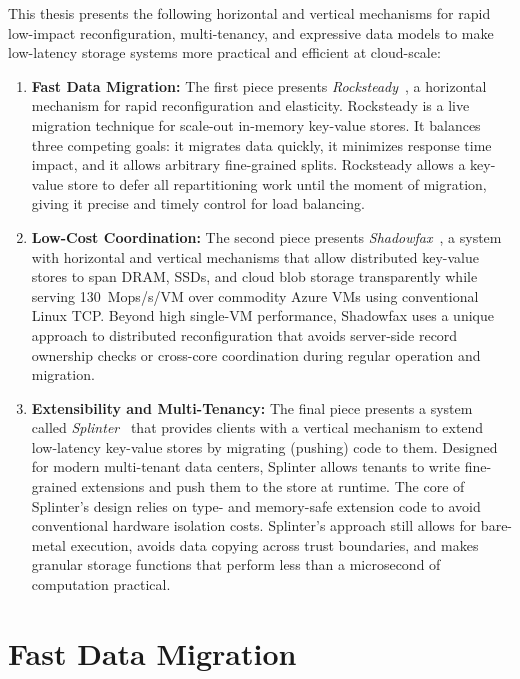 \vspace{8pt}

This thesis presents the following horizontal and vertical mechanisms
for rapid low-impact reconfiguration, multi-tenancy, and expressive data
models to make low-latency storage systems more practical and efficient
at cloud-scale:

\begin{enumerate}
\item \textbf{Fast Data Migration:}
The first piece presents \emph{Rocksteady}~\cite{rocksteady},
a horizontal mechanism for rapid reconfiguration and elasticity.
%
Rocksteady is a live migration technique for scale-out
in-memory key-value stores.
%
It balances three competing goals: it
migrates data quickly, it minimizes response time impact, and it
allows arbitrary fine-grained splits.
%
Rocksteady allows a key-value store to defer all repartitioning work
until the moment of migration, giving it precise and timely control for
load balancing.

\item \textbf{Low-Cost Coordination:}
The second piece presents \emph{Shadowfax}~\cite{shadowfax},
a system with horizontal and vertical mechanisms that
allow distributed key-value stores to
span DRAM, SSDs, and cloud blob storage transparently while serving
130~Mops/s/VM over commodity Azure VMs using conventional Linux TCP.
%
Beyond
high single-VM performance, Shadowfax uses a unique approach to distributed
reconfiguration that avoids server-side record ownership checks
or cross-core coordination during regular operation and migration.

\item \textbf{Extensibility and Multi-Tenancy:}
The final piece presents a system called \emph{Splinter}~\cite{splinter}
that
provides clients with a vertical mechanism
to extend low-latency key-value stores by migrating (pushing) code to them.
%
Designed for
modern multi-tenant data centers, Splinter allows
tenants to write
fine-grained extensions and push
them to the store at runtime.
%
The core of
Splinter's design relies on type- and memory-safe
extension code to avoid conventional hardware isolation costs.
%
Splinter's approach
still allows for bare-metal execution, avoids data copying across trust
boundaries, and makes granular storage functions that perform less than
a microsecond of computation practical.

\end{enumerate}

\section{Fast Data Migration}

